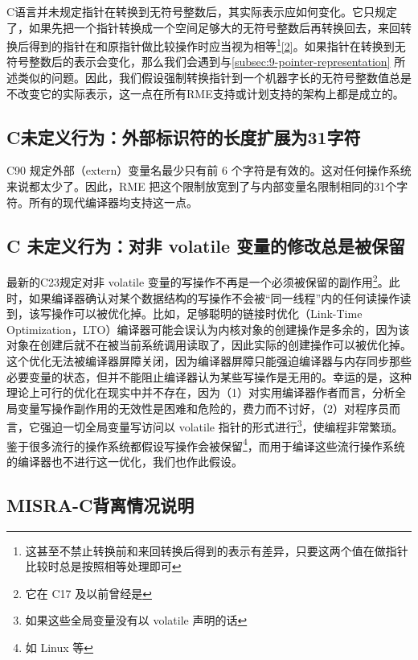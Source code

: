 C语言并未规定指针在转换到无符号整数后，其实际表示应如何变化。它只规定了，如果先把一个指针转换成一个空间足够大的无符号整数后再转换回去，来回转换后得到的指针在和原指针做比较操作时应当视为相等\footnote{这甚至不禁止转换前和来回转换后得到的表示有差异，只要这两个值在做指针比较时总是按照相等处理即可}\hyperref[cite:9-2]{{[}2{]}}。如果指针在转换到无符号整数后的表示会变化，那么我们会遇到与\ref{subsec:9-pointer-representation}
所述类似的问题。因此，我们假设强制转换指针到一个机器字长的无符号整数值总是不改变它的实际表示，这一点在所有RME支持或计划支持的架构上都是成立的。

\subsection{C未定义行为：外部标识符的长度扩展为31字符}\label{subsec:9-external-identifier-length}

C90 规定外部（extern）变量名最少只有前 6 个字符是有效的。这对任何操作系统来说都太少了。因此，RME 把这个限制放宽到了与内部变量名限制相同的31个字符。所有的现代编译器均支持这一点。

\subsection{C 未定义行为：对非 volatile 变量的修改总是被保留}\label{subsec:9-nonvolatile-write-preserved}

最新的C23规定对非 volatile 变量的写操作不再是一个必须被保留的副作用\footnote{它在 C17 及以前曾经是}。此时，如果编译器确认对某个数据结构的写操作不会被``同一线程''内的任何读操作读到，该写操作可以被优化掉。比如，足够聪明的链接时优化（Link-Time
  Optimization，LTO）编译器可能会误认为内核对象的创建操作是多余的，因为该对象在创建后就不在被当前系统调用读取了，因此实际的创建操作可以被优化掉。这个优化无法被编译器屏障关闭，因为编译器屏障只能强迫编译器与内存同步那些必要变量的状态，但并不能阻止编译器认为某些写操作是无用的。幸运的是，这种理论上可行的优化在现实中并不存在，因为（1）对实用编译器作者而言，分析全局变量写操作副作用的无效性是困难和危险的，费力而不讨好，（2）对程序员而言，它强迫一切全局变量写访问以 volatile 指针的形式进行\footnote{如果这些全局变量没有以 volatile 声明的话}，使编程非常繁琐。鉴于很多流行的操作系统都假设写操作会被保留\footnote{如 Linux 等}，而用于编译这些流行操作系统的编译器也不进行这一优化，我们也作此假设。

\subsection{MISRA-C背离情况说明}\label{subsec:9-misra-c-deviations}

